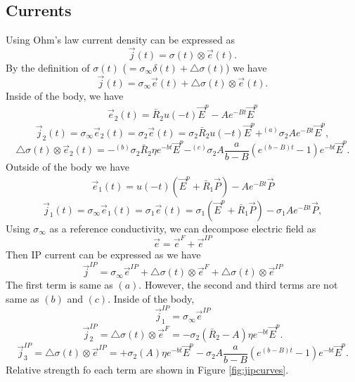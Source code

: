 \documentclass[a4paper, 11pt]{article}
\newcommand {\E}{{\vec E}}
\newcommand{\siginf}{\sigma_\infty}
\newcommand{\dsig}{\triangle\sigma}
\renewcommand {\j}  { {\vec j} }
\newcommand {\e}  { {\vec e} }
\begin{document}
\subsection{Currents}
Using Ohm's law current density can be expressed as 
\begin{equation}
	\j(t) = \sigma(t) \otimes \e(t).
\end{equation}
By the definition of $\sigma(t)$ ($=\siginf\delta(t) + \dsig(t)$) we have
\begin{equation}
	\j(t) = \siginf\e(t) + \dsig(t)\otimes \e(t).
\end{equation}
Inside of the body, we have
\begin{align*}
	\e_2(t) = \bar{R}_2u(-t)\E^p
	- Ae^{-Bt}\E^p
\end{align*}
\begin{equation}
	\j_2(t) = \siginf\e_2(t) = \sigma_2 \e(t) = \sigma_2\bar{R}_2 u(-t)\E^{p} + ^{(a)} \sigma_2 A e^{-Bt}\E^{p},
\end{equation}
\begin{equation}
	\dsig(t)\otimes \e_2(t) =  - ^{(b)} \sigma_2 \bar{R}_2\eta e^{-bt}\E^{p} - ^{(c)} \sigma_2 A\frac{a}{b-B}(e^{(b-B)t}-1)e^{-bt}\E^{p}.
\end{equation}
Outside of the body we have
\begin{align*}
	\e_1(t) = u(-t)(\E^p+\bar{R}_1 \vec{P})  - A
	e^{-Bt}\vec{P}
\end{align*}
\begin{equation}
	\j_1(t) = \siginf\e_1(t) = \sigma_1 \e(t) = \sigma_1(\E^p+\bar{R}_1 \vec{P}) - \sigma_1 A e^{-Bt}\vec{P},
\end{equation}
Using $\siginf$ as a reference conductivity, we can decompose electric field as 
\begin{equation*}
	\e = \e^{F} + \e^{IP}
\end{equation*}
Then IP current can be expressed as we have
\begin{equation*}
	\j^{IP} = \siginf\e^{IP} + \dsig(t)\otimes\e^{F} + \dsig(t)\otimes\e^{IP}
\end{equation*}
The first term is same as $(a)$. However, the second and third terms are not same as $(b)$ and $(c)$. Inside of the body, 
\begin{equation*}
	\j^{IP}_1 = \siginf\e^{IP}
\end{equation*}
\begin{equation*}
	\j^{IP}_2 = \dsig(t)\otimes\e^{F} = - \sigma_2 (\bar{R}_2-A)\eta e^{-bt}\E^{p}.
\end{equation*}
\begin{equation*}
	\j^{IP}_3 = \dsig(t)\otimes\e^{IP} = +\sigma_2 (A)\eta e^{-bt}\E^{p} - \sigma_2 A\frac{a}{b-B}(e^{(b-B)t}-1)e^{-bt}\E^{p}.
\end{equation*}
Relative strength fo each term are shown in Figure  \ref{fig:jipcurves}.
\end{document}
